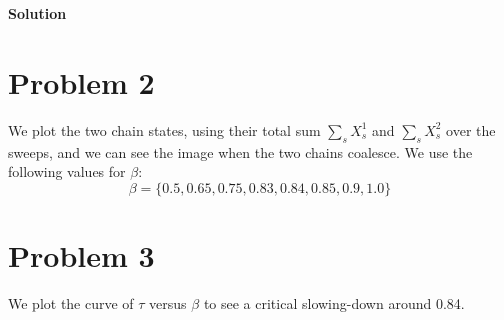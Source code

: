 \documentclass[letterpaper,11pt]{article}
\begin{document}
\noindent
\textbf{Solution} \\


\pagebreak

\section*{Problem 2}
We plot the two chain states, using their total sum $\sum_{s} X_s^1$ and $\sum_{s} X_s^2$ over the sweeps, and we can see the image when the two chains coalesce. We use the following values for $\beta$:
$$\beta = \{ 0.5, 0.65, 0.75, 0.83, 0.84, 0.85, 0.9, 1.0 \}$$




\section*{Problem 3}
We plot the curve of $\tau$ versus $\beta$ to see a critical slowing-down around 0.84. \\
\end{document}
